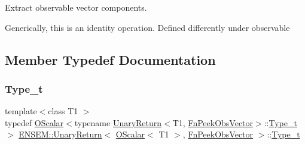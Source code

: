 Extract observable vector components. 

Generically, this is an identity operation. Defined differently under observable 

\subsection{Member Typedef Documentation}
\mbox{\label{structENSEM_1_1UnaryReturn_3_01OScalar_3_01T1_01_4_00_01FnPeekObsVector_01_4_afbb417d857c687872160aa2c33bf13a2}} 
\subsubsection{\texorpdfstring{Type\_t}{Type\_t}\hspace{0.1cm}{\footnotesize\ttfamily [1/2]}}
{\footnotesize\ttfamily template$<$class T1 $>$ \\
typedef \mbox{\hyperlink{classENSEM_1_1OScalar}{O\+Scalar}}$<$typename \mbox{\hyperlink{structENSEM_1_1UnaryReturn}{Unary\+Return}}$<$T1, \mbox{\hyperlink{structENSEM_1_1FnPeekObsVector}{Fn\+Peek\+Obs\+Vector}}$>$\+::\mbox{\hyperlink{structENSEM_1_1UnaryReturn_3_01OScalar_3_01T1_01_4_00_01FnPeekObsVector_01_4_afbb417d857c687872160aa2c33bf13a2}{Type\+\_\+t}}$>$ \mbox{\hyperlink{structENSEM_1_1UnaryReturn}{E\+N\+S\+E\+M\+::\+Unary\+Return}}$<$ \mbox{\hyperlink{classENSEM_1_1OScalar}{O\+Scalar}}$<$ T1 $>$, \mbox{\hyperlink{structENSEM_1_1FnPeekObsVector}{Fn\+Peek\+Obs\+Vector}} $>$\+::\mbox{\hyperlink{structENSEM_1_1UnaryReturn_3_01OScalar_3_01T1_01_4_00_01FnPeekObsVector_01_4_afbb417d857c687872160aa2c33bf13a2}{Type\+\_\+t}}}

\mbox{\label{structENSEM_1_1UnaryReturn_3_01OScalar_3_01T1_01_4_00_01FnPeekObsVector_01_4_afbb417d857c687872160aa2c33bf13a2}} 

